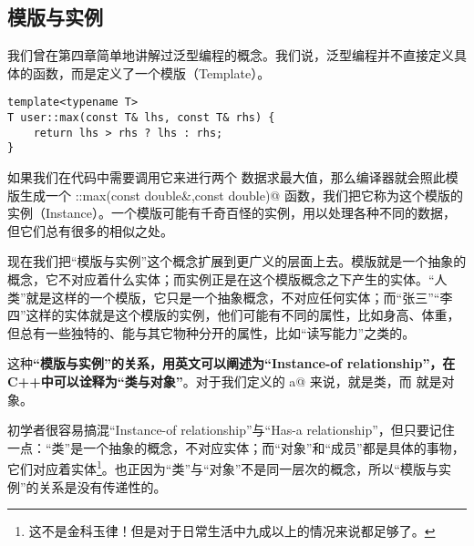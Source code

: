 \subsection*{模版与实例}
我们曾在第四章简单地讲解过泛型编程的概念。我们说，泛型编程并不直接定义具体的函数，而是定义了一个模版（Template）。
\begin{lstlisting}
template<typename T>
T user::max(const T& lhs, const T& rhs) {
    return lhs > rhs ? lhs : rhs;
}
\end{lstlisting}
如果我们在代码中需要调用它来进行两个 \lstinline@double@ 数据求最大值，那么编译器就会照此模版生成一个 \lstinline@user::max(const double&,const double)@ 函数，我们把它称为这个模版的实例（Instance）。一个模版可能有千奇百怪的实例，用以处理各种不同的数据，但它们总有很多的相似之处。\par
现在我们把``模版与实例''这个概念扩展到更广义的层面上去。模版就是一个抽象的概念，它不对应着什么实体；而实例正是在这个模版概念之下产生的实体。``人类''就是这样的一个模版，它只是一个抽象概念，不对应任何实体；而``张三''``李四''这样的实体就是这个模版的实例，他们可能有不同的属性，比如身高、体重，但总有一些独特的、能与其它物种分开的属性，比如``读写能力''之类的。\par
这种\textbf{``模版与实例''的关系，用英文可以阐述为``Instance-of relationship''，在C++中可以诠释为``类与对象''}。对于我们定义的 \lstinline@valarri a@ 来说，\lstinline@valarri@ 就是类，而 \lstinline@a@ 就是对象。\par
初学者很容易搞混``Instance-of relationship''与``Has-a relationship''，但只要记住一点：``类''是一个抽象的概念，不对应实体；而``对象''和``成员''都是具体的事物，它们对应着实体\footnote{这不是金科玉律！但是对于日常生活中九成以上的情况来说都足够了。}。也正因为``类''与``对象''不是同一层次的概念，所以``模版与实例''的关系是没有传递性的。\par
